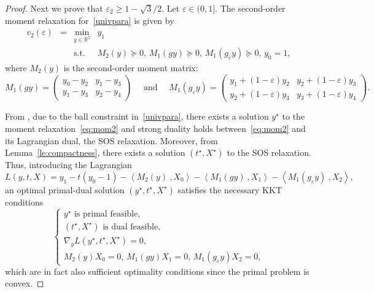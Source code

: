 \documentclass[a4paper,12pt]{article}
\newcommand{\proscal}[2]{\left\langle#1\:,#2\right\rangle}
\newcommand{\RR}{\mathbb{R}}
\begin{document}
\begin{proof}
{
Next we prove that $\varepsilon_2 \geq 1-\sqrt{3}/2$. 
Let $\varepsilon \in (0, 1]$. The second-order
moment relaxation for~\eqref{univpara} 
is given by
\begin{equation}\label{eq:mom2}
\begin{array}{rcrl}
v_2(\varepsilon) & = & \min_{y \in \RR^5} & y_1 \\
&&\mathrm{s.t.} & M_2(y) \succeq 0 ,\,  M_1(gy) \succeq 0 ,\, M_1(g_\varepsilon y) \succeq 0 ,\, y_0 = 1 ,\, 
\end{array}
\end{equation}
where $M_2(y)$ is the second-order moment matrix:
\begin{equation}
M_1(gy) = \begin{pmatrix}
y_0 - y_2 & y_1 - y_3 \\
y_1 - y_3 & y_2 - y_4
\end{pmatrix}
\quad \text{ and } \quad
M_1(g_\varepsilon y) = \begin{pmatrix}
y_1 + (1-\varepsilon)y_2 & y_2 + (1-\varepsilon)y_3 \\
y_2 + (1-\varepsilon)y_3 & y_3 + (1-\varepsilon)y_4
\end{pmatrix} .	
\end{equation}

From \cite{jh16}, due to the ball constraint in~\eqref{univpara},
there exists a solution $y^\star$ to the moment relaxation~\eqref{eq:mom2}
and strong duality holds between~\eqref{eq:mom2} and its Lagrangian dual, the SOS relaxation. 
Moreover, from Lemma~\ref{le:compactness}, there exists a
solution $(t^\star, X^\star)$ to the SOS relaxation. 
%
Thus, introducing the Lagrangian 
\begin{equation}
	L(y, t, X) = y_1 - t(y_0-1) - \proscal{M_2(y)}{X_0} - \proscal{M_1(gy)}{X_1} 
	- \proscal{M_1(g_\varepsilon y)}{X_2},
\end{equation} 
an optimal primal-dual solution $(y^\star, t^\star, X^\star)$
satisfies the necessary KKT conditions
\begin{equation}
	\label{eq:KKT}
	\begin{cases}
	y^\star \text{ is primal feasible,} \\
	(t^\star, X^\star) \text{ is dual feasible,} \\
	\nabla_yL(y^\star, t^\star, X^\star) = 0, \\
	M_2(y)X_0 = 0 ,\, M_1(gy)X_1 = 0 ,\, 
	M_1(g_\varepsilon y)X_2 = 0 ,\,
	\end{cases}
\end{equation}
which are in fact also sufficient optimality conditions
since the primal problem is convex.

}
\end{proof}
\end{document}
